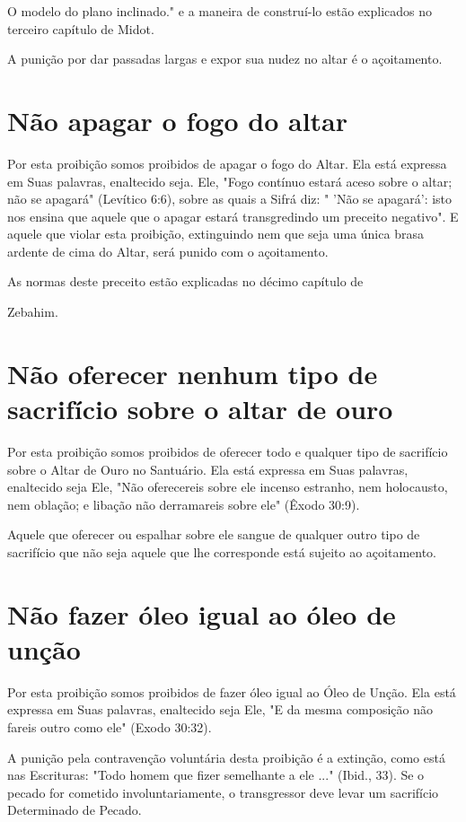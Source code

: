 O modelo do plano inclinado." e a maneira de
construí-lo estão ex­plicados no terceiro capítulo de Midot.

A punição por dar passadas largas e expor sua nudez no altar é o
açoitamento.

\section{Não apagar o fogo do altar}

Por esta proibição somos proibidos de apagar o fogo do Altar. Ela está
expressa em Suas palavras, enaltecido seja. Ele, "Fogo contínuo estará
ace­so sobre o altar; não se apagará" (Levítico 6:6), sobre as quais a
Sifrá diz: " 'Não se apagará': isto nos ensina que aquele que o apagar
estará transgredindo um preceito negativo". E aquele que violar esta
proibição, extinguindo nem que seja uma única brasa ardente de cima do
Altar, será punido com o açoitamento.


As normas deste preceito estão explicadas no décimo capítulo de


Zebahim.

\section{Não oferecer nenhum tipo de sacrifício sobre o altar de ouro}

Por esta proibição somos proibidos de oferecer todo e qualquer ti­po de
sacrifício sobre o Altar de Ouro no Santuário. Ela está expressa em Suas
palavras, enaltecido seja Ele, "Não oferecereis sobre ele incenso
estranho, nem holocausto, nem oblação; e libação não derramareis sobre
ele" (Êxodo 30:9).

Aquele que oferecer ou espalhar sobre ele sangue de qualquer outro tipo
de sacrifício que não seja aquele que lhe corresponde está sujeito ao
açoitamento.

\section{Não fazer óleo igual ao óleo de unção}

Por esta proibição somos proibidos de fazer óleo igual ao Óleo de Unção.
Ela está expressa em Suas palavras, enaltecido seja Ele, "E da mesma
composição não fareis outro como ele" (Exodo 30:32).

A punição pela contravenção voluntária desta proibição é a extin­ção,
como está nas Escrituras: "Todo homem que fizer semelhante a ele ..."
(Ibid., 33). Se o pecado for cometido involuntariamente, o transgressor
deve levar um sacrifício Determinado de Pecado.


